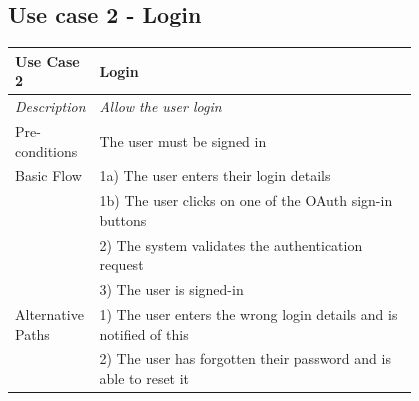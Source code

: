 \documentclass[12pt]{article}
\begin{document}
	\subsection{Use case 2 - Login}
	\label{chap:use-cases-2}	
	\begin{table}[H]
		\begin{tabular}{|l|p{0.8\linewidth}}
			\hline
			\rowcolor[HTML]{EFEFEF} 
			\textbf{Use Case 2}  & \textbf{Login}                                            \\ \hline
			\rowcolor[HTML]{F5FBFF} 
			\textit{Description} & \textit{Allow the user login}                          \\ \hline
			\rowcolor[HTML]{EFEFEF} 
			Pre-conditions       & The user must be signed in                                         \\ \hline
			\rowcolor[HTML]{F5FBFF} 
			Basic Flow           & 1a) The user enters their login details                            \\
			\rowcolor[HTML]{F5FBFF} 
			& 1b) The user clicks on one of the OAuth sign-in buttons            \\
			\rowcolor[HTML]{F5FBFF} 
			& 2) The system validates the authentication request                 \\
			\rowcolor[HTML]{F5FBFF} 
			& 3) The user is signed-in                                           \\ \hline
			\rowcolor[HTML]{EFEFEF} 
			Alternative Paths    & 1) The user enters the wrong login details and is notified of this \\
			\rowcolor[HTML]{EFEFEF} 
			& 2) The user has forgotten their password and is able to reset it \\ \hline
		\end{tabular}
	\end{table}
	
\end{document}
